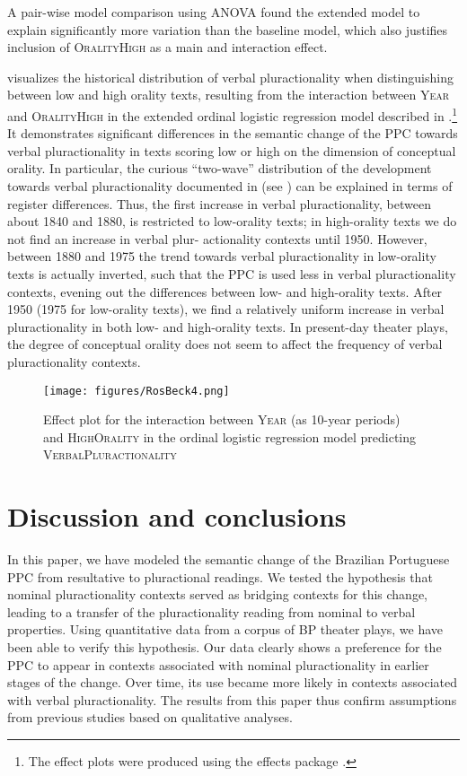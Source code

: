 \documentclass[output=paper,colorlinks,citecolor=brown]{langscibook}
\begin{document}
A pair-wise model comparison using ANOVA \parencite[see][285--293 for application]{Gries2013} found the extended model to explain significantly more variation than the baseline model, which also justifies inclusion of \textsc{OralityHigh} as a main and interaction effect. 

  visualizes the historical distribution of verbal pluractionality when distinguishing between low and high orality texts, resulting from the interaction between \textsc{Year} and \textsc{OralityHigh} in the extended ordinal logistic regression model described in  .\footnote{The effect plots were produced using the effects package \parencite{FoxHong2009}.} It demonstrates significant differences in the semantic change of the PPC towards verbal pluractionality in texts scoring low or high on the dimension of conceptual orality. In particular, the curious “two-wave” distribution of the development towards verbal pluractionality documented in  (see  ) can be explained in terms of register differences. Thus, the first increase in verbal pluractionality, between about 1840 and 1880, is restricted to low-orality texts; in high-orality texts we do not find an increase in verbal plur- actionality contexts until 1950. However, between 1880 and 1975 the trend towards verbal pluractionality in low-orality texts is actually inverted, such that the PPC is used less in verbal pluractionality contexts, evening out the differences between low- and high-orality texts. After 1950 (1975 for low-orality texts), we find a relatively uniform increase in verbal pluractionality in both low- and high-orality texts. In present-day theater plays, the degree of conceptual orality does not seem to affect the frequency of verbal pluractionality contexts.

\begin{figure}
\texttt{[image: figures/RosBeck4.png]}
\caption{Effect plot for the interaction between \textsc{Year} (as 10-year periods) and \textsc{HighOrality} in the ordinal logistic regression model predicting \textsc{VerbalPluractionality}}
\label{fig:rb4}
\end{figure}


\section{Discussion and conclusions}\largerpage

In this paper, we have modeled the semantic change of the Brazilian Portuguese PPC from resultative to pluractional readings. We tested the hypothesis that nominal pluractionality contexts served as bridging contexts for this change, leading to a transfer of the pluractionality reading from nominal to verbal properties. Using quantitative data from a corpus of BP theater plays, we have been able to verify this hypothesis. Our data clearly shows a preference for the PPC to appear in contexts associated with nominal pluractionality in earlier stages of the change. Over time, its use became more likely in contexts associated with verbal pluractionality. The results from this paper thus confirm assumptions from previous studies based on qualitative analyses.
\end{document}
